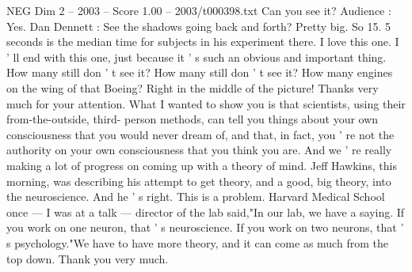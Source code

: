 \begin{textsample}{NEG Dim 2 – 2003 – Score 1.00 – 2003/t000398.txt}
Can you see it?
Audience : Yes.
Dan Dennett : See the shadows going back and forth?
Pretty big.
So 15. 5 seconds is the median time for subjects in his experiment there.
I love this one.
I ' ll end with this one, just because it ' s such an obvious and important thing.
How many still don ' t see it?
How many still don ' t see it?
How many engines on the wing of that Boeing?
Right in the middle of the picture!
Thanks very much for your attention.
What I wanted to show you is that scientists, using their from-the-outside, third- person methods, can tell you things about your own consciousness that you would never dream of, and that, in fact, you ' re not the authority on your own consciousness that you think you are.
And we ' re really making a lot of progress on coming up with a theory of mind.
Jeff Hawkins, this morning, was describing his attempt to get theory, and a good, big theory, into the neuroscience.
And he ' s right.
This is a problem.
Harvard Medical School once — I was at a talk — director of the lab said,"In our lab, we have a saying.
If you work on one neuron, that ' s neuroscience.
If you work on two neurons, that ' s psychology."We have to have more theory, and it can come as much from the top down.
Thank you very much.

\end{textsample}
